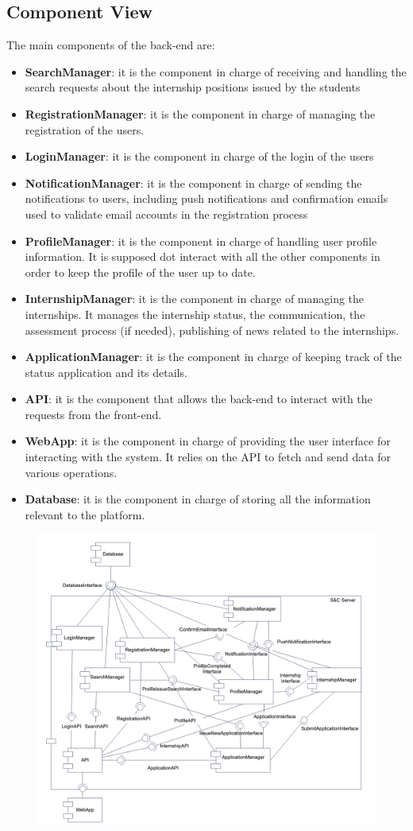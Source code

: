 \subsection{Component View}
The main components of the back-end are:
\begin{itemize}
    \item \textbf{SearchManager}: it is the component in charge of receiving and handling the search requests about the internship positions issued by the students 
    \item \textbf{RegistrationManager}: it is the component in charge of managing the registration of the users.
    \item \textbf{LoginManager}: it is the component in charge of the login of the users
    \item \textbf{NotificationManager}: it is the component in charge of sending the notifications to users, including push notifications and confirmation emails used to validate email accounts in the registration process
    \item \textbf{ProfileManager}: it is the component in charge of handling user profile information. It is supposed dot interact with all the other components in order to keep the profile of the user up to date.
    \item \textbf{InternshipManager}: it is the component in charge of managing the internships. It manages the internship status, the communication, the assessment process (if needed), publishing of news related to the internships.
    \item \textbf{ApplicationManager}: it is the component in charge of keeping track of the status application and its details.
    \item \textbf{API}: it is the component that allows the back-end to interact with the requests from the front-end.
    \item \textbf{WebApp}: it is the component in charge of providing the user interface for interacting with the system. It relies on the API to fetch and send data for various operations.
    \item \textbf{Database}: it is the component in charge of storing all the information relevant to the platform.
\end{itemize}
\begin{figure}[h!]
        \centering  \includegraphics[width=1\textwidth]{DD/Images/ComponentViewDiagram.png}
        \label{fig:ComponentViewDiagram}
\end{figure}

